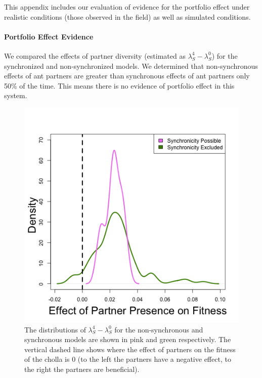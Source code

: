 \documentclass[11pt]{article}
\begin{document}
This appendix includes our evaluation of evidence for the portfolio effect under realistic conditions (those observed in the field) as well as simulated conditions.

\paragraph{Portfolio Effect Evidence}
	We compared the effects of partner diversity (estimated as $\lambda_S^4 - \lambda_S^0$) for the synchronized and non-synchronized models.
	We determined that non-synchronous effects of ant partners are greater than synchronous effects of ant partners only 50\% of the time.
	This means there is no evidence of portfolio effect in this system.


\begin{figure}[H]
	\includegraphics[width=\linewidth]{Figures/portfolio_effect.png}
	\caption{The distributions of $\lambda_{S}^4-\lambda_{S}^0$ for the non-synchronous and synchronous models are shown in pink and green respectively. The vertical dashed line shows where the effect of partners on the fitness of the cholla is 0 (to the left the partners have a negative effect, to the right the partners are beneficial).}
	\label{fig:Portfolio}
\end{figure}
\end{document}
